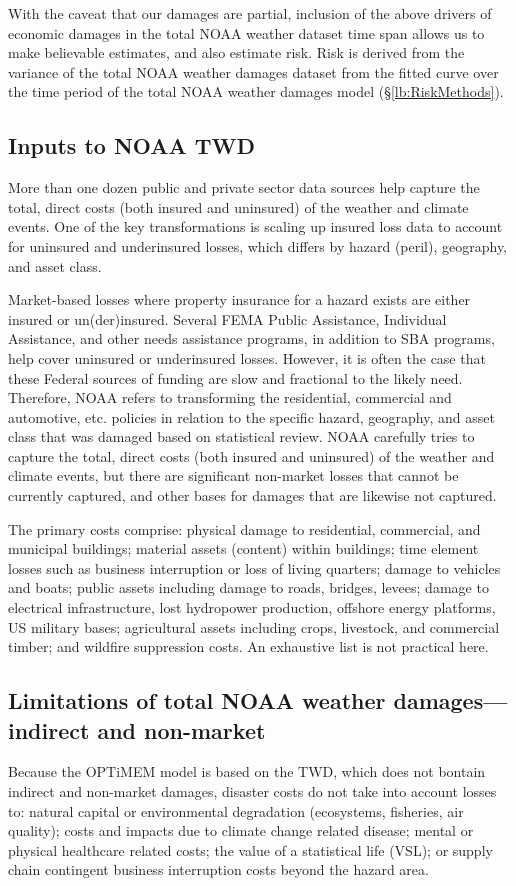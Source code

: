 \documentclass{article}
\begin{document}
With the caveat that our damages are partial, inclusion of the above drivers of economic damages in the total NOAA weather dataset time span allows us to make believable estimates, and also estimate risk. Risk is derived from the variance of the total NOAA weather damages dataset from the fitted curve over the time period of the total NOAA weather damages model (\S\ref{lb:RiskMethods}).

\subsection{Inputs to NOAA TWD}
\label{InputsToNOAATWD}
More than one dozen public and private sector data sources help capture the total, direct costs (both insured and uninsured) of the weather and climate events. One of the key transformations is scaling up insured loss data to account for uninsured and underinsured losses, which differs by hazard (peril), geography, and asset class.

Market-based losses where property insurance for a hazard exists are either insured or un(der)insured. Several FEMA Public Assistance, Individual Assistance, and other needs assistance programs, in addition to SBA programs, help cover uninsured or underinsured losses.  However, it is often the case that these Federal sources of funding are slow and fractional to the likely need. Therefore, NOAA refers to transforming the residential, commercial and automotive, etc. policies in relation to the specific hazard, geography, and asset class that was damaged based on statistical review.  NOAA carefully tries to capture the total, direct costs (both insured and uninsured) of the weather and climate events, but there are significant non-market losses that cannot be currently captured, and other bases for damages that are likewise not captured.

The primary costs comprise: physical damage to residential, commercial, and municipal buildings; material assets (content) within buildings; time element losses such as business interruption or loss of living quarters; damage to vehicles and boats; public assets including damage to roads, bridges, levees; damage to electrical infrastructure, lost hydropower production, offshore energy platforms, US military bases; agricultural assets including crops, livestock, and commercial timber; and wildfire suppression costs. An exhaustive list is not practical here. 

\subsection{Limitations of total NOAA weather damages---indirect and non-market}
\label{NOAADamagesLimitations}
Because the OPTiMEM model is based on the TWD, which does not bontain indirect and non-market damages, disaster costs do not take into account losses to: natural capital or environmental degradation (ecosystems, fisheries, air quality); costs and impacts due to climate change related disease; mental or physical healthcare related costs; the value of a statistical life (VSL); or supply chain contingent business interruption costs beyond the hazard area.
\end{document}
